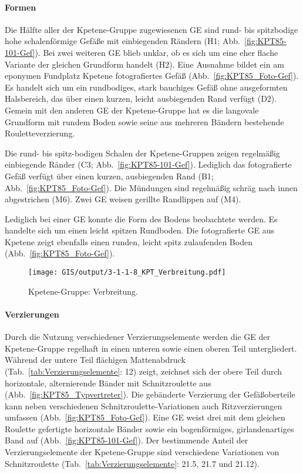 \paragraph{Formen}
$\;$ \\
Die Hälfte aller der Kpetene-Gruppe zugewiesenen GE sind rund- bis spitzbodige hohe schalenförmige Gefäße mit einbiegenden Rändern (H1; Abb.~\ref{fig:KPT85-101-Gef}). Bei zwei weiteren GE blieb unklar, ob es sich um eine eher flache Variante der gleichen Grundform handelt (H2). Eine Ausnahme bildet ein am eponymen Fundplatz Kpetene fotografiertes Gefäß (Abb.~\ref{fig:KPT85_Foto-Gef}). Es handelt sich um ein rundbodiges, stark bauchiges Gefäß ohne ausgeformten Halsbereich, das über einen kurzen, leicht ausbiegenden Rand verfügt (D2). Gemein mit den anderen GE der Kpetene-Gruppe hat es die langovale Grundform mit rundem Boden sowie seine aus mehreren Bändern bestehende Rouletteverzierung.

Die rund- bis spitz-bodigen Schalen der Kpetene-Gruppen zeigen regelmäßig einbiegende Ränder (C3; Abb.~\ref{fig:KPT85-101-Gef}). Lediglich das fotografierte Gefäß verfügt über einen kurzen, ausbiegenden Rand (B1; Abb.~\ref{fig:KPT85_Foto-Gef}). Die Mündungen sind regelmäßig schräg nach innen abgestrichen (M6). Zwei GE weisen gerillte Randlippen auf (M4).

Lediglich bei einer GE konnte die Form des Bodens beobachtete werden. Es handelte sich um einen leicht spitzen Rundboden. Die fotografierte GE aus Kpetene zeigt ebenfalls einen runden, leicht spitz zulaufenden Boden (Abb.~\ref{fig:KPT85_Foto-Gef}).

\begin{figure*}[p]
	\centering
	\texttt{[image: GIS/output/3-1-1-8\_KPT\_Verbreitung.pdf]}
	\caption{Kpetene-Gruppe: Verbreitung.}
	\label{fig:KPT_Verbreitung}
\end{figure*}

\paragraph{Verzierungen}
$\;$ \\
Durch die Nutzung verschiedener Verzierungselemente werden die GE der Kpetene-Gruppe regelhaft in einen unteren sowie einen oberen Teil untergliedert. Während der untere Teil flächigen Mattenabdruck (Tab.~\ref{tab:Verzierungselemente}: 12) zeigt, zeichnet sich der obere Teil durch horizontale, alternierende Bänder mit Schnitzroulette aus (Abb.~\ref{fig:KPT85_Typvertreter}). Die gebänderte Verzierung der Gefäßoberteile kann neben verschiedenen Schnitzroulette-Variationen auch Ritzverzierungen umfassen (Abb.~\ref{fig:KPT85_Foto-Gef}). Eine GE weist drei mit dem gleichen Roulette gefertigte horizontale  Bänder sowie ein bogenförmiges, girlandenartiges Band auf (Abb.~\ref{fig:KPT85-101-Gef}). Der bestimmende Anteil der Verzierungselemente der Kpetene-Gruppe sind verschiedene Variationen von Schnitzroulette (Tab.~\ref{tab:Verzierungselemente}: 21.5, 21.7 und 21.12).

